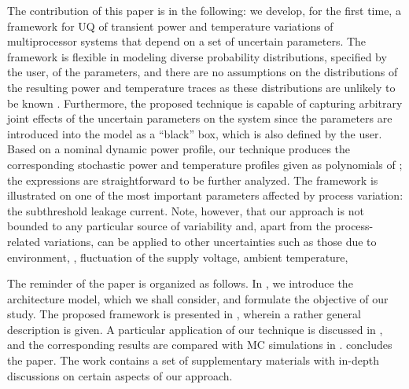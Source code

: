 The contribution of this paper is in the following: we develop, for the first time, a framework for UQ of transient power and temperature variations of multiprocessor systems that depend on a set of uncertain parameters. The framework is flexible in modeling diverse probability distributions, specified by the user, of the parameters, and there are no assumptions on the distributions of the resulting power and temperature traces as these distributions are unlikely to be known \apriori. Furthermore, the proposed technique is capable of capturing arbitrary joint effects of the uncertain parameters on the system since the parameters are introduced into the model as a ``black'' box, which is also defined by the user. Based on a nominal dynamic power profile, our technique produces the corresponding stochastic power and temperature profiles given as polynomials of \rvs; the expressions are straightforward to be further analyzed. The framework is illustrated on one of the most important parameters affected by process variation: the subthreshold leakage current. Note, however, that our approach is not bounded to any particular source of variability and, apart from the process-related variations, can be applied to other uncertainties such as those due to environment, \ie, fluctuation of the supply voltage, ambient temperature, \etc

The reminder of the paper is organized as follows. In , we introduce the architecture model, which we shall consider, and formulate the objective of our study. The proposed framework is presented in , wherein a rather general description is given. A particular application of our technique is discussed in , and the corresponding results are compared with MC simulations in .  concludes the paper. The work contains a set of supplementary materials with in-depth discussions on certain aspects of our approach.
